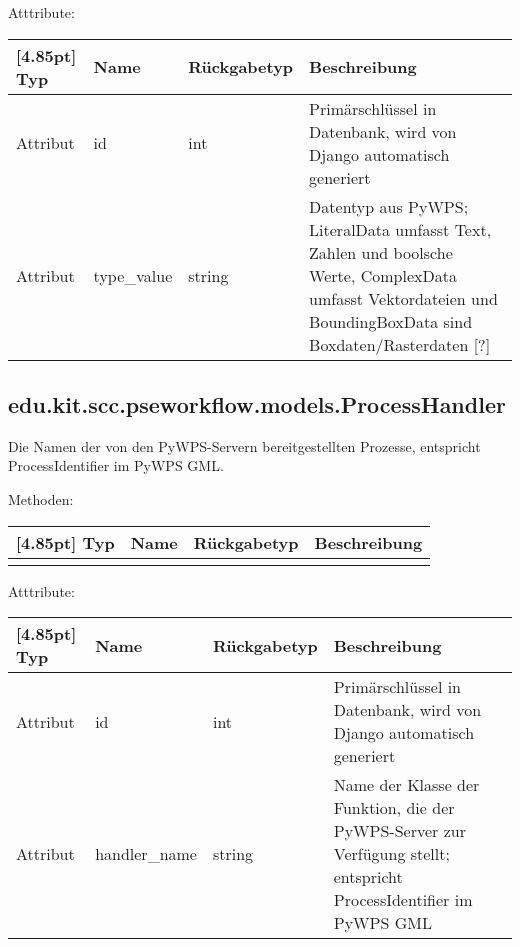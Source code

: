 			Atttribute:
			\begin{center}
				\setlength\tabcolsep{5pt}
				\renewcommand{\arraystretch}{1.5}
				
				\begin{tabularx}{\textwidth}{|l|l|l|X|}
					\hline
					\rowcolor[gray]{0.75}[4.85pt]
					Typ & Name & Rückgabetyp & Beschreibung \\ \hline 
					Attribut & id & int & Primärschlüssel in Datenbank, wird von Django automatisch generiert \\ \hline
					Attribut & type\_value & string & Datentyp aus PyWPS; LiteralData umfasst Text, Zahlen und boolsche Werte, ComplexData umfasst Vektordateien und BoundingBoxData sind Boxdaten/Rasterdaten [?] \\
					\hline
				\end{tabularx}
			\end{center}
		
		\subsection{edu.kit.scc.pseworkflow.models.ProcessHandler}
			Die Namen der von den PyWPS-Servern bereitgestellten Prozesse, entspricht ProcessIdentifier im PyWPS GML.
			
			Methoden:
			\begin{center}
				\setlength\tabcolsep{5pt}
				\renewcommand{\arraystretch}{1.5}
				
				\begin{tabularx}{\textwidth}{|l|l|l|X|}
					\hline
					\rowcolor[gray]{0.75}[4.85pt]
					Typ & Name & Rückgabetyp & Beschreibung \\ \hline 
					&&& \\
					\hline
				\end{tabularx}
			\end{center}
			
			Atttribute:
			\begin{center}
				\setlength\tabcolsep{5pt}
				\renewcommand{\arraystretch}{1.5}
				
				\begin{tabularx}{\textwidth}{|l|l|l|X|}
					\hline
					\rowcolor[gray]{0.75}[4.85pt]
					Typ & Name & Rückgabetyp & Beschreibung \\ \hline 
					Attribut & id & int & Primärschlüssel in Datenbank, wird von Django automatisch generiert \\ \hline
					Attribut & handler\_name & string & Name der Klasse der Funktion, die der PyWPS-Server zur Verfügung stellt; entspricht ProcessIdentifier im PyWPS GML \\
					\hline
				\end{tabularx}
			\end{center}
		

